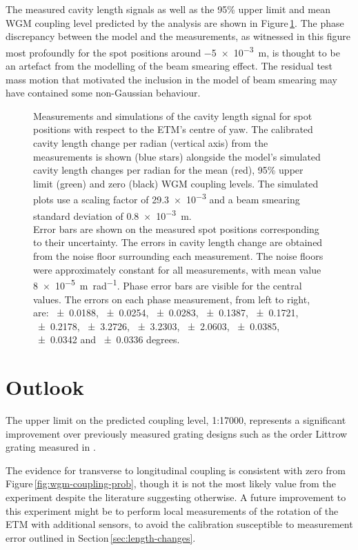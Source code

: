 The measured cavity length signals as well as the 95\% upper limit and mean \gls{WGM} coupling level predicted by the analysis are shown in Figure\,\ref{fig:wgm-coupling}. The phase discrepancy between the model and the measurements, as witnessed in this figure most profoundly for the spot positions around \SI{-5e-3}{\meter}, is thought to be an artefact from the modelling of the beam smearing effect. The residual test mass motion that motivated the inclusion in the model of beam smearing may have contained some non-Gaussian behaviour.

\begin{figure}
  \centering
  
  \caption[Measurements and simulations of the cavity length signal for spot positions with respect to the end test mass's centre of yaw]{\label{fig:wgm-coupling}Measurements and simulations of the cavity length signal for spot positions with respect to the \gls{ETM}'s centre of yaw. The calibrated cavity length change per radian (vertical axis) from the measurements is shown (blue stars) alongside the model's simulated cavity length changes per radian for the mean (red), 95\% upper limit (green) and zero (black) \gls{WGM} coupling levels. The simulated plots use a scaling factor of \num{29.3e-3} and a beam smearing standard deviation of \SI{0.8e-3}{\meter}.
  \bigskip
  \\ Error bars are shown on the measured spot positions corresponding to their uncertainty. The errors in cavity length change are obtained from the noise floor surrounding each measurement. The noise floors were approximately constant for all measurements, with mean value \SI{8e-5}{\meter \per \radian}. Phase error bars are visible for the central values. The errors on each phase measurement, from left to right, are: \num{+-0.0188}, \num{+-0.0254}, \num{+-0.0283}, \num{+-0.1387}, \num{+-0.1721}, \num{+-0.2178}, \num{+-3.2726}, \num{+-3.2303}, \num{+-2.0603}, \num{+-0.0385}, \num{+-0.0342} and \num{+-0.0336} degrees.}
\end{figure}

\section{Outlook}
The upper limit on the predicted coupling level, 1:17000, represents a significant improvement over previously measured grating designs such as the  order Littrow grating measured in \cite{Barr2011}.

The evidence for transverse to longitudinal coupling is consistent with zero from Figure\,\ref{fig:wgm-coupling-prob}, though it is not the most likely value from the experiment despite the literature suggesting otherwise. A future improvement to this experiment might be to perform local measurements of the rotation of the \gls{ETM} with additional sensors, to avoid the calibration susceptible to measurement error outlined in Section\,\ref{sec:length-changes}.

